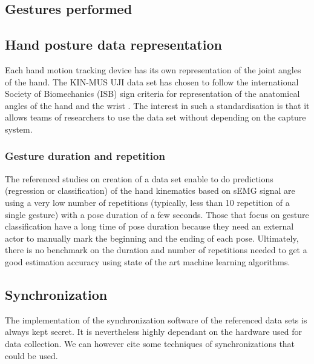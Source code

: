 \documentclass[12pt]{article}
\begin{document}
	
	
	
	
	
	
	\subsection{Gestures performed}
	
	
	
	
	\subsection{Hand posture data representation}
	
	Each hand motion tracking device has its own representation of the joint angles of the hand. The KIN-MUS UJI data set \cite{ref:KinMusUji} has chosen to follow the international Society of Biomechanics (ISB) sign criteria for representation of the anatomical angles of the hand and the wrist \cite{ref:handAnatomicalAngles}. The interest in such a standardisation is that it allows teams of researchers to use the data set without depending on the capture system.
	
	
	
	\subsubsection{Gesture duration and repetition}
	
	The referenced studies on creation of a data set enable to do predictions (regression or classification) of the hand kinematics based on sEMG signal are using a very low number of repetitions (typically, less than 10 repetition of a single gesture) with a pose duration of a few seconds. Those that focus on gesture classification have a long time of pose duration because they need an external actor to manually mark the beginning and the ending of each pose. Ultimately, there is no benchmark on the duration and number of repetitions needed to get a good estimation accuracy using state of the art machine learning algorithms.
	
	
	
	\subsection{Synchronization}
	
	The implementation of the synchronization software of the referenced data sets is always kept secret. It is nevertheless highly dependant on the hardware used for data collection. We can however cite some techniques of synchronizations that could be used.
	
\end{document}
